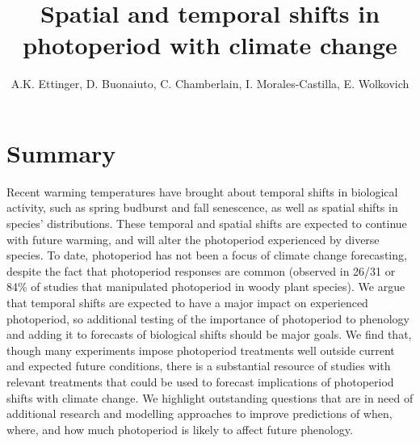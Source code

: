 \documentclass{article}
\begin{document}
 
\title{Spatial and temporal shifts in photoperiod with climate change} %

\author{A.K. Ettinger, D. Buonaiuto, C. Chamberlain, I. Morales-Castilla, E. Wolkovich}
\maketitle  %


\section*{Summary}
Recent warming temperatures have brought about temporal shifts in biological activity, such as spring budburst and fall senescence, as well as spatial shifts in species' distributions. These temporal and spatial shifts are expected to continue with future warming, and will alter the photoperiod experienced by diverse species. To date, photoperiod has not been a focus of climate change forecasting, despite the fact that photoperiod responses are common (observed in 26/31 or 84\% of studies that manipulated photoperiod in woody plant species). We argue that temporal shifts are expected to have a major impact on experienced photoperiod, so additional testing of the importance of photoperiod to phenology and adding it to forecasts of biological shifts should be major goals. We find that, though many experiments impose photoperiod treatments well outside current and expected future conditions, there is a substantial resource of studies with relevant treatments that could be used to forecast implications of photoperiod shifts with climate change. We highlight outstanding questions that are in need of additional research and modelling approaches to improve predictions of when, where, and how much photoperiod is likely to affect future phenology.
\end{document}
